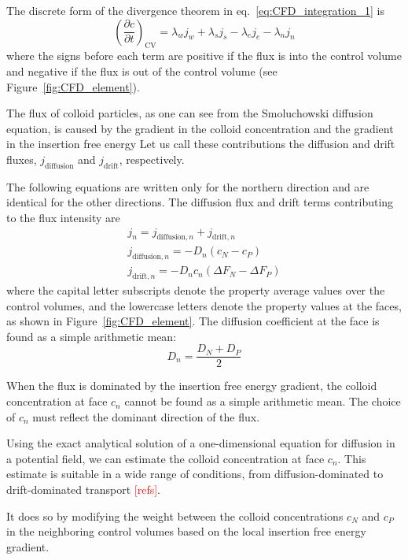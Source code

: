 \documentclass[10pt, a4paper]{article}
\newcommand\todo[1]{\textcolor{red}{#1}}
\begin{document}
\begin{multicols}{2}
The discrete form of the divergence theorem in eq.~\ref{eq:CFD_integration_1} is
\begin{equation}
    \label{eq:CFD_integration_2}
    \left( \frac{\partial c}{\partial t} \right)_{\textrm{CV}} = \lambda_w j_w + \lambda_s j_s - \lambda_e j_e - \lambda_n j_n
\end{equation}
where the signs before each term are positive if the flux is into the control volume and negative if the flux is out of the control volume (see Figure~\ref{fig:CFD_element}).

The flux of colloid particles, as one can see from the Smoluchowski diffusion equation, is caused by the gradient in the colloid concentration and the gradient in the insertion free energy
Let us call these contributions the diffusion and drift fluxes, $j_{\textrm{diffusion}}$ and $j_{\textrm{drift}}$, respectively.

The following equations are written only for the northern direction and are identical for the other directions.
The diffusion flux and drift terms contributing to the flux intensity are
\begin{eqnarray}
    j_n = j_{\textrm{diffusion}, n} + j_{\textrm{drift}, n} \\
    j_{\textrm{diffusion}, n} = - D_n (c_N - c_P) \\
    j_{\textrm{drift}, n} = - D_n c_n (\Delta F_N - \Delta F_P)
\end{eqnarray}
where the capital letter subscripts denote the property average values over the control volumes, and the lowercase letters denote the property values at the faces, as shown in Figure~\ref{fig:CFD_element}.
The diffusion coefficient at the face is found as a simple arithmetic mean:
\begin{equation}
    D_n = \frac{D_N + D_P}{2}
\end{equation}

When the flux is dominated by the insertion free energy gradient, the colloid concentration at face $c_n$ cannot be found as a simple arithmetic mean.
The choice of $c_n$ must reflect the dominant direction of the flux.

Using the exact analytical solution of a one-dimensional equation for diffusion in a potential field, we can estimate the colloid concentration at face $c_n$.
This estimate is suitable in a wide range of conditions, from diffusion-dominated to drift-dominated transport \todo{[refs]}.

It does so by modifying the weight between the colloid concentrations $c_N$ and $c_P$ in the neighboring control volumes based on the local insertion free energy gradient.


\end{multicols}
\end{document}
